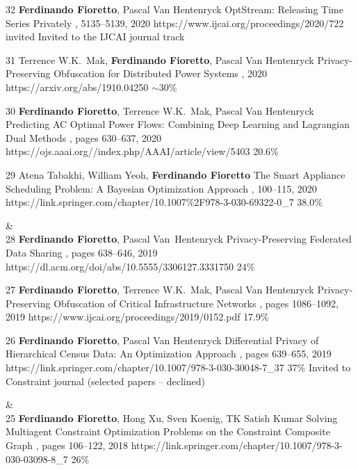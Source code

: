 \begin{pubs}
	\confentryAwd
		{32} %
		{{\bf Ferdinando Fioretto}, Pascal Van Hentenryck}
		{OptStream: Releasing Time Series Privately}
		{\procIJCAI, 5135--5139, 2020}
	    {https://www.ijcai.org/proceedings/2020/722}
		{invited}
		{Invited to the IJCAI journal track}{}
	
	\confentry
		{31} %
		{Terrence W.K.~Mak, {\bf Ferdinando Fioretto}, Pascal Van Hentenryck}
		{Privacy-Preserving Obfuscation for Distributed Power Systems}
		{\procPSCC, 2020}
		{https://arxiv.org/abs/1910.04250}
	    {$\sim$30\%} %

	\confentry
		{30} %
		{{\bf Ferdinando Fioretto}, Terrence W.K.~Mak, Pascal Van Hentenryck}
		{Predicting AC Optimal Power Flows: Combining Deep Learning and Lagrangian Dual Methods}
	  	{\procAAAI, pages 630--637, 2020}
	  	{https://ojs.aaai.org//index.php/AAAI/article/view/5403}
	    {20.6\%} %

	\confentry
		{29} %
	    {Atena Tabakhi, William Yeoh, {\bf Ferdinando Fioretto}}
	    {The Smart Appliance Scheduling Problem: A Bayesian Optimization Approach}
	    {\procPRIMA, 100--115, 2020}
	    {https://link.springer.com/chapter/10.1007\%2F978-3-030-69322-0\_7}
	    {38.0\%} %

{}&\nemph{\rule{0.5\linewidth}{0.5pt}}\\[1em]
	\confentry
		{28} %
		{{\bf Ferdinando Fioretto}, Pascal Van~Hentenryck}
		{Privacy-Preserving Federated Data Sharing}
	  	{\procAAMAS, pages 638--646, 2019}
	  	{https://dl.acm.org/doi/abs/10.5555/3306127.3331750}
		{24\%} %

	\confentry
		{27} %
		{{\bf Ferdinando Fioretto}, Terrence W.K.~Mak, Pascal Van Hentenryck}
		{Privacy-Preserving Obfuscation of Critical Infrastructure Networks}
	  	{\procIJCAI, pages 1086--1092, 2019}
	  	{https://www.ijcai.org/proceedings/2019/0152.pdf}
	    {17.9\%} %

	\confentryAwd
		{26} %
		{{\bf Ferdinando Fioretto}, Pascal Van Hentenryck}
		{Differential Privacy of Hierarchical Census Data: An Optimization Approach} 
		{\procCP, pages 639--655, 2019}
		{https://link.springer.com/chapter/10.1007/978-3-030-30048-7\_37}
		{37\%}
		{Invited to Constraint journal}
		{(selected papers -- declined)}

{}&\nemph{\rule{0.5\linewidth}{0.5pt}}\\[1em]
	\confentry 
		{25} %
		{{\bf Ferdinando Fioretto}, Hong Xu, Sven Koenig, TK Satish Kumar}
	 	{Solving Multiagent Constraint Optimization Problems on the Constraint Composite Graph}
		{\procPRIMA, pages 106--122, 2018}
		{https://link.springer.com/chapter/10.1007/978-3-030-03098-8\_7}
	    {26\%} %


\end{pubs}
